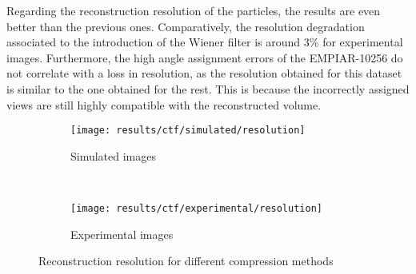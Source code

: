 \documentclass[../main.tex]{subfiles}
\begin{document}
Regarding the reconstruction resolution of the particles, the results are even better than the previous ones. Comparatively, the resolution degradation associated to the introduction of the Wiener filter is around $3 \si{\percent}$ for experimental images. Furthermore, the high angle assignment errors of the EMPIAR-10256 do not correlate with a loss in resolution, as the resolution obtained for this dataset is similar to the one obtained for the rest. This is because the incorrectly assigned views are still highly compatible with the reconstructed volume.

\begin{figure}[htbp]
    \centering
    \begin{subfigure}[b]{.8\textwidth}
         \centering
         \texttt{[image: results/ctf/simulated/resolution]}
         \caption{Simulated images}
    \end{subfigure}\\
    \vspace{2em}
    \begin{subfigure}[b]{.8\textwidth}
         \centering
         \texttt{[image: results/ctf/experimental/resolution]}
         \caption{Experimental images}
    \end{subfigure}
    \caption{Reconstruction resolution for different compression methods}
    \label{fig:5:ctf_resolution}
\end{figure}
\end{document}
